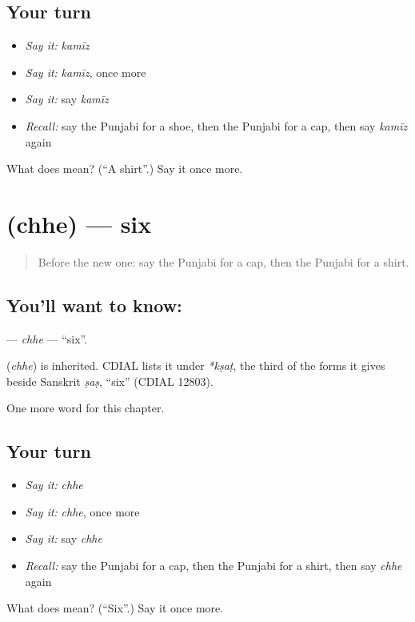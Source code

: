\subsection*{Your turn}
\begin{itemize}
\raggedright
  \item \emph{Say it:} \emph{kamīz}
  \item \emph{Say it:} \emph{kamīz}, once more
  \item \emph{Say it:} say \emph{kamīz}
  \item \emph{Recall:} say the Punjabi for a shoe, then the Punjabi for a cap, then say \emph{kamīz} again
\end{itemize}

\begin{tcolorbox}[breakable,colback=teal!4,colframe=teal!35!black,title={Before you move on}]
What does  mean? (\textquotedblleft{}A shirt\textquotedblright{}.) Say it once more.
\end{tcolorbox}
\section[\texorpdfstring{\pa{ਛੇ} (chhe)}{ਛੇ (chhe)}]{ (chhe) — six}

\label{lesson:PA-C94-chhe}



\begin{quote}
Before the new one: say the Punjabi for a cap, then the Punjabi for a shirt.
\end{quote}

\subsection*{You'll want to know: }
\textbf{} — \emph{chhe} — \textquotedblleft{}six\textquotedblright{}.

\begin{cousinweb}
\textbf{} (\emph{chhe}) is inherited. CDIAL lists it under \emph{*kṣaṭ}, the third of the forms it gives beside Sanskrit \emph{ṣaṣ}, \textquotedblleft{}six\textquotedblright{} (CDIAL 12803).
\end{cousinweb}

\begin{grammarlens}[title={What you've built}]
One more word for this chapter.
\end{grammarlens}

\subsection*{Your turn}
\begin{itemize}
\raggedright
  \item \emph{Say it:} \emph{chhe}
  \item \emph{Say it:} \emph{chhe}, once more
  \item \emph{Say it:} say \emph{chhe}
  \item \emph{Recall:} say the Punjabi for a cap, then the Punjabi for a shirt, then say \emph{chhe} again
\end{itemize}

\begin{tcolorbox}[breakable,colback=teal!4,colframe=teal!35!black,title={Before you move on}]
What does  mean? (\textquotedblleft{}Six\textquotedblright{}.) Say it once more.
\end{tcolorbox}
